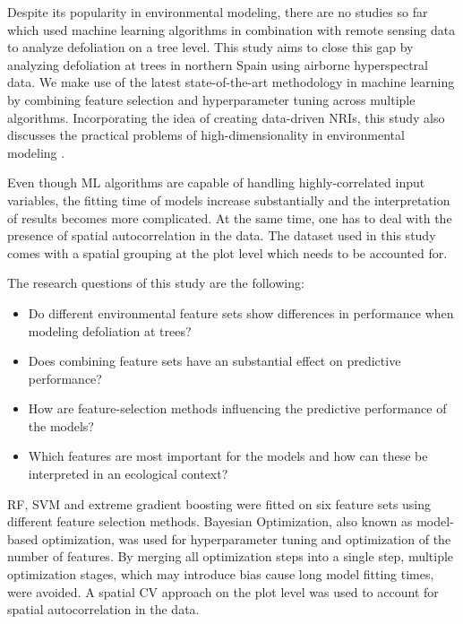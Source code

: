 \documentclass[letterpaper, peerreview]{IEEEtran}
\begin{document}

Despite its popularity in environmental modeling, there are no studies so far which used machine learning algorithms in combination with remote sensing data to analyze defoliation on a tree level.
This study aims to close this gap by analyzing defoliation at trees in northern Spain using airborne hyperspectral data.
We make use of the latest state-of-the-art methodology in machine learning by combining feature selection and hyperparameter tuning across multiple algorithms.
Incorporating the idea of creating data-driven \ac{NRI}s, this study also discusses the practical problems of high-dimensionality in environmental modeling \cite{trunk1979, xu2016}.

Even though \ac{ML} algorithms are capable of handling highly-correlated input variables, the fitting time of models increase substantially and the interpretation of results becomes more complicated.
At the same time, one has to deal with the presence of spatial autocorrelation in the data.
The dataset used in this study comes with a spatial grouping at the plot level which needs to be accounted for.

The research questions of this study are the following:

\begin{itemize}

	\item Do different environmental feature sets show differences in performance when modeling defoliation at trees?
	      
	\item Does combining feature sets have an substantial effect on predictive performance?
	      
	\item How are feature-selection methods influencing the predictive performance of the models?
	      
	\item Which features are most important for the models and how can these be interpreted in an ecological context?
	      
\end{itemize}

\noindent \ac{RF}, \ac{SVM} and extreme gradient boosting were fitted on six feature sets using different feature selection methods.
Bayesian Optimization, also known as model-based optimization, was used for hyperparameter tuning and optimization of the number of features.
By merging all optimization steps into a single step, multiple optimization stages, which may introduce bias cause long model fitting times, were avoided.
A spatial \ac{CV} approach on the plot level was used to account for spatial autocorrelation in the data.
\end{document}
